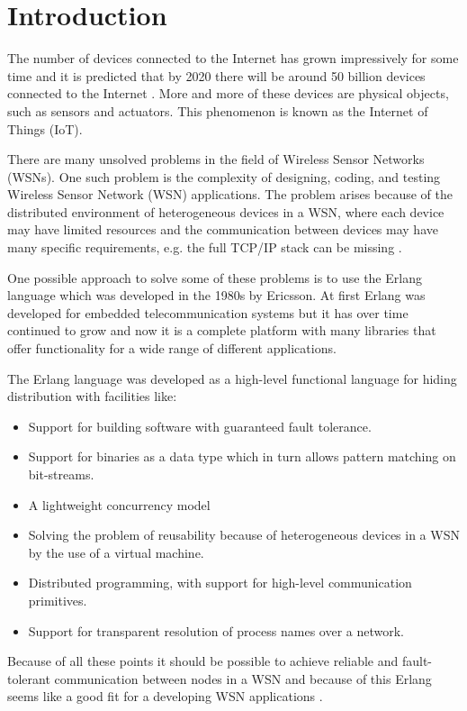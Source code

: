 \chapter{Introduction}
The number of devices connected to the Internet has grown impressively for some time and it is predicted that by 2020 there will be around 50 billion devices connected to the Internet \citep{BELLO201752}.  More and more of these devices are physical objects, such as sensors and actuators. This phenomenon is known as the Internet of Things (IoT).

There are many unsolved problems in the field of Wireless Sensor Networks (WSNs). One such problem is the complexity of designing, coding, and testing Wireless Sensor Network (WSN) applications. The problem arises because of the distributed environment of heterogeneous devices in a WSN, where each device may have limited resources and the communication between devices may have many specific requirements, e.g. the full TCP/IP stack can be missing \citep{sivieri2012wsn}.

One possible approach to solve some of these problems is to use the Erlang language which was developed in the 1980s by Ericsson. At first Erlang was developed for embedded telecommunication systems but it has over time continued to grow and now it is a complete platform with many libraries that offer functionality for a wide range of different applications. 

The Erlang language was developed as a high-level functional language for hiding distribution with facilities like:

\begin{itemize}
    \item Support for building software with guaranteed fault tolerance.
    \item Support for binaries as a data type which in turn allows pattern matching on bit-streams.
    \item A lightweight concurrency model
    \item Solving the problem of reusability because of heterogeneous devices in a WSN by the use of a virtual machine.
    \item Distributed programming, with support for high-level communication primitives. 
    \item Support for transparent resolution of process names over a network.
\end{itemize}

Because of all these points it should be possible to achieve reliable and fault-tolerant communication between nodes in a WSN and because of this Erlang seems like a good fit for a developing WSN applications \citep{sivieri2012wsn, sivieri2012erlang}.

